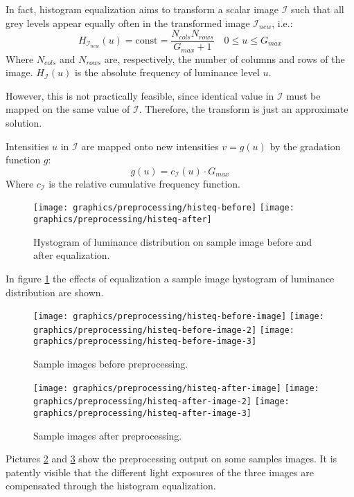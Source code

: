     \par{
        In fact, histogram equalization aims to transform a scalar image $\mathcal{I}$ such that all grey levels appear equally often in the transformed image $\mathcal{I}_{new}$, i.e.:
        \begin{equation*}
            H_{\mathcal{I}_{new}}(u) = \text{const} = \frac{N_{cols}N_{rows}}{G_{max} + 1} \quad 0 \leq u \leq G_{max}
        \end{equation*}
        Where $N_{cols}$ and $N_{rows}$ are, respectively, the number of columns and rows of the image. $H_{\mathcal{I}}(u)$ is the absolute frequency of luminance level $u$.
    }
    \par{
        However, this is not practically feasible, since identical value in $\mathcal{I}$ must be mapped on the same value of $\mathcal{I}$. Therefore, the transform is just an approximate solution.
    }
    \par{
        Intensities $u$ in $\mathcal{I}$ are mapped onto new intensities $v = g(u)$ by the gradation function $g$: 
        \begin{equation*}
            g(u) = c_{\mathcal{I}}(u) \cdot G_{max}
        \end{equation*}
        Where $c_{\mathcal{I}}$ is the relative cumulative frequency function.
    }
    \begin{figure}
        \texttt{[image: graphics/preprocessing/histeq-before]}
        \texttt{[image: graphics/preprocessing/histeq-after]}
        \caption{Hystogram of luminance distribution on sample image before and after equalization.}\label{fig:equalization}
    \end{figure}
    \par{
        In figure \ref{fig:equalization} the effects of equalization a sample image hystogram of luminance distribution are shown.
    }
    \begin{figure}
        \texttt{[image: graphics/preprocessing/histeq-before-image]}
        \texttt{[image: graphics/preprocessing/histeq-before-image-2]}
        \texttt{[image: graphics/preprocessing/histeq-before-image-3]}
        \caption{Sample images before preprocessing.}\label{fig:preprocessing_image_before}
    \end{figure}
    \begin{figure}
        \texttt{[image: graphics/preprocessing/histeq-after-image]}
        \texttt{[image: graphics/preprocessing/histeq-after-image-2]}
        \texttt{[image: graphics/preprocessing/histeq-after-image-3]}
        \caption{Sample images after preprocessing.}\label{fig:preprocessing_image_after}
    \end{figure}
    \par{
        Pictures \ref{fig:preprocessing_image_before} and \ref{fig:preprocessing_image_after} show the preprocessing output on some samples images. It is patently visible that the different light exposures of the three images are compensated through the histogram equalization.
    }